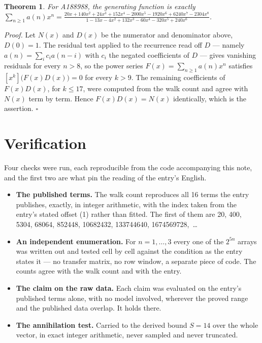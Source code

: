 \documentclass[11pt]{article}
\newtheorem{theorem}{Theorem}
\theoremstyle{definition}
\begin{document}
\begin{theorem} For A188988, the generating function is exactly $\sum_{n\ge 1} a(n)x^n = \frac{20x + 140x^{2} + 24x^{3} + 152x^{4} - 2000x^{5} - 1920x^{6} + 6240x^{7} - 2304x^{8}}{1 - 13x - 4x^{2} + 132x^{3} - 60x^{4} - 320x^{5} + 240x^{6}}$.\end{theorem}

{\itshape Proof.} Let $N(x)$ and $D(x)$ be the numerator and denominator above, $D(0)=1$. The residual test applied to the recurrence read off $D$ --- namely $a(n) = \sum_i c_i a(n-i)$ with $c_i$ the negated coefficients of $D$ --- gives vanishing residuals for every $n > 8$, so the power series $F(x)=\sum_{n\ge 1}a(n)x^n$ satisfies $[x^k]\bigl(F(x)D(x)\bigr) = 0$ for every $k > 9$. The remaining coefficients of $F(x)D(x)$, for $k \le 17$, were computed from the walk count and agree with $N(x)$ term by term. Hence $F(x)D(x) = N(x)$ identically, which is the assertion. $\square$

\section{Verification}

Four checks were run, each reproducible from the code accompanying this note, and the first two are what pin the reading of the entry's English.

\begin{itemize}

\item {\bfseries The published terms.} The walk count reproduces all 16 terms the entry publishes, exactly, in integer arithmetic, with the index taken from the entry's stated offset (1) rather than fitted. The first of them are 20, 400, 5304, 68064, 852448, 10682432, 133744640, 1674569728,~\dots

\item {\bfseries An independent enumeration.} For $n = 1,\dots,3$ every one of the $2^{5n}$ arrays was written out and tested cell by cell against the condition as the entry states it --- no transfer matrix, no row window, a separate piece of code. The counts agree with the walk count and with the entry.

\item {\bfseries The claim on the raw data.} Each claim was evaluated on the entry's published terms alone, with no model involved, wherever the proved range and the published data overlap. It holds there.

\item {\bfseries The annihilation test.} Carried to the derived bound $S = 14$ over the whole vector, in exact integer arithmetic, never sampled and never truncated.

\end{itemize}
\end{document}
